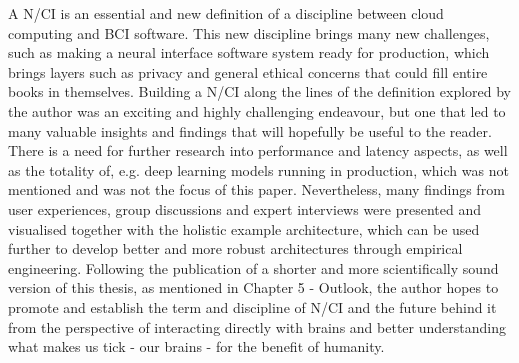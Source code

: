 A N/CI is an essential and new definition of a discipline between cloud computing and BCI software. This new discipline brings many new challenges, such as making a neural interface software system ready for production, which brings layers such as privacy and general ethical concerns that could fill entire books in themselves. Building a N/CI along the lines of the definition explored by the author was an exciting and highly challenging endeavour, but one that led to many valuable insights and findings that will hopefully be useful to the reader. There is a need for further research into performance and latency aspects, as well as the totality of, e.g. deep learning models running in production, which was not mentioned and was not the focus of this paper. Nevertheless, many findings from user experiences, group discussions and expert interviews were presented and visualised together with the holistic example architecture, which can be used further to develop better and more robust architectures through empirical engineering. Following the publication of a shorter and more scientifically sound version of this thesis, as mentioned in Chapter 5 - Outlook, the author hopes to promote and establish the term and discipline of N/CI and the future behind it from the perspective of interacting directly with brains and better understanding what makes us tick - our brains - for the benefit of humanity.

